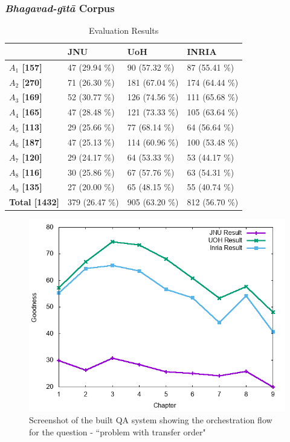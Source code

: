 \documentclass[11pt]{article}
\begin{document}
\subsubsection{\textit{Bhagavad-g\={\i}t\={a}} Corpus}
\begin{table}[h]
	\begin{center}
		\begin{tabular}{p{1.4cm} | p{1.6cm} | p{1.5cm} | p{1.5cm}}
			\hline 
			& \bf JNU & \bf UoH & \bf INRIA \\
			\hline
			
			
			\bf $A_1$ [157] &   47 (29.94 \%) &   90 (57.32 \%) &   87 (55.41 \%) \\
			\bf $A_2$ [270] &   71 (26.30 \%) &   181 (67.04 \%) &   174 (64.44 \%) \\
			\bf $A_3$ [169] &   52 (30.77 \%) &   126 (74.56 \%) &   111 (65.68 \%) \\
			\bf $A_4$ [165] &   47 (28.48 \%) &   121 (73.33 \%) &   105 (63.64 \%) \\
			\bf $A_5$ [113] &   29 (25.66 \%) &   77 (68.14 \%) &   64 (56.64 \%) \\
			\bf $A_6$ [187] &   47 (25.13 \%) &   114 (60.96 \%) &   100 (53.48 \%) \\
			\bf $A_7$ [120] &   29 (24.17 \%) &   64 (53.33 \%) &   53 (44.17 \%) \\
			\bf $A_8$ [116] &   30 (25.86 \%) &   67 (57.76 \%) &   63 (54.31 \%) \\
			\bf $A_9$ [135] &   27 (20.00 \%) &   65 (48.15 \%) &   55 (40.74 \%) \\
			\bf Total [1432] &   379 (26.47 \%) &   905 (63.20 \%) &   812 (56.70 \%) \\
			\hline
		\end{tabular}
	\end{center}
	\caption{\label{font-table} Evaluation Results }
\end{table}

\begin{figure}[h]
	\center
	\includegraphics[scale=0.34]{images/merge.png}
	\caption{\label{screen}Screenshot of the built QA system showing the orchestration flow for the question - ``problem with transfer order"}
\end{figure}
\end{document}
